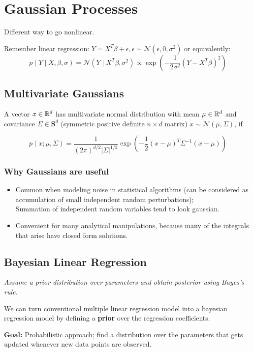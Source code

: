 \section{Gaussian Processes}
Different way to go nonlinear.

Remember linear regression: $Y = X^T\beta + \epsilon, \epsilon\sim \mathcal N(\epsilon, 0, \sigma^2)$
or equivalently:
$$
	p(Y\mid X,\beta,\sigma) = \mathcal N(Y\mid X^T\beta, \sigma^2) \propto \exp\left(-\frac{1}{2\sigma^2}(Y - X^T\beta)^2\right)
$$

\subsection{Multivariate Gaussians}
A vector $x\in\mathbb R^d$ has multivariate normal distribution with mean $\mu\in\mathbb R^d$ and covariance $\Sigma\in \mathbf S^d$ (symmetric positive definite $n\times d$ matrix) $x\sim \mathcal N(\mu, \Sigma)$, if

$$
	p(x;\mu,\Sigma) = \frac{1}{(2\pi)^{d/2}|\Sigma|^{1/2}}\exp\left(-\frac
	1 2 (x-\mu)^T\Sigma^{-1}(x-\mu)\right)
$$

\subsubsection{Why Gaussians are useful}
\begin{itemize}
	\item Common when modeling noise in statistical algorithms (can be considered as accumulation of small independent random perturbations);\\ 
		Summation of independent random variables tend to look gaussian.
	\item Convenient for many analytical manipulations, because many of the integrals that arise have closed form solutions.
\end{itemize}


\subsection{Bayesian Linear Regression} 
\textit{Assume a prior distribution over parameters and obtain posterior using Bayes's rule.}

\vspace{1em}
We can turn conventional multiple linear regression model into a bayesian regression model by defining a \textbf{prior} over the regression coefficients.

\textbf{Goal: } Probabilistic approach; find a distribution over the parameters that gets updated whenever new data points are observed.

